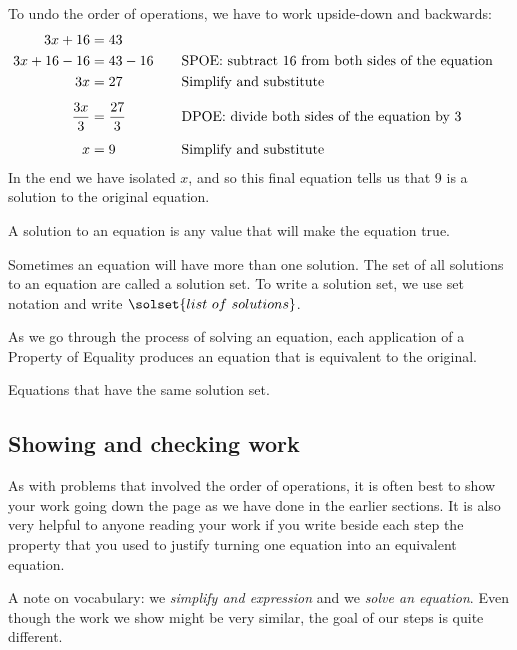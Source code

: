 To undo the order of operations, we have to work upside-down and backwards:
\[\begin{aligned}
3x + 16 & = 43\\
3x + 16 - 16 & = 43 - 16
&&\text{\quad SPOE: subtract 16 from both sides of the equation}\\
3x & = 27
&&\text{\quad Simplify and substitute}\\[1ex]
\frac{3x}{3} & = \frac{27}{3}
&&\text{\quad DPOE: divide both sides of the equation by 3}\\[1ex]
x & = 9
&&\text{\quad Simplify and substitute}\\
\end{aligned}\]
In the end we have isolated $x$, and so this final equation tells us that 9 is a solution to the original equation.

\begin{boxdef}
A \gls{solution} to an equation is any value that will make the equation true.

Sometimes an equation will have more than one solution. The set of all solutions to an equation are called a \gls{solution set}. To write a solution set, we use set notation and write $\solset{list ~ of ~ solutions}$.
\end{boxdef}

As we go through the process of solving an equation, each application of a Property of Equality produces an equation that is equivalent to the original.

\begin{boxdef}
Equations that have the same solution set.
\end{boxdef}

\subsection{Showing and checking work}

As with problems that involved the order of operations, it is often best to show your work going down the page as we have done in the earlier sections. It is also very helpful to anyone reading your work if you write beside each step the property that you used to justify turning one equation into an equivalent equation.

A note on vocabulary: we \textit{simplify and expression} and we \textit{solve an equation}. Even though the work we show might be very similar, the goal of our steps is quite different.

